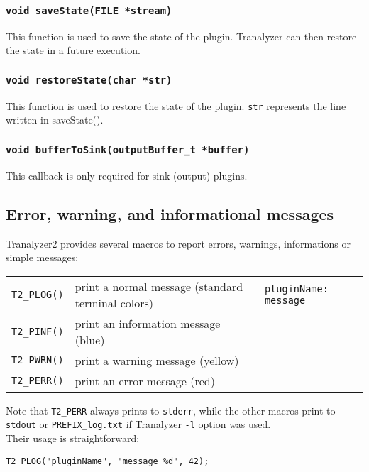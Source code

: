 \documentclass[documentation]{subfiles}
\begin{document}
\subsubsection{\tt void saveState(FILE *stream)}\label{t2cb-saveState}
This function is used to save the state of the plugin.
Tranalyzer can then restore the state in a future execution.

\subsubsection{\tt void restoreState(char *str)}\label{t2cb-restoreState}
This function is used to restore the state of the plugin.
{\tt str} represents the line written in {saveState()}.

\subsubsection{\tt void bufferToSink(outputBuffer\_t *buffer\label{t2cb-bufferToSink})}
This callback is only required for sink (output) plugins.

\subsection{Error, warning, and informational messages}
Tranalyzer2 provides several macros to report errors, warnings, informations or simple messages:
\begin{longtable}{lll}
    \toprule
    {\tt T2\_PLOG()} & print a normal message (standard terminal colors) & {\tt pluginName: message}\\
    {\tt T2\_PINF()} & print an information message (blue) & \color{blue}{\tt [INF] pluginName: message}\\
    {\tt T2\_PWRN()} & print a warning message (yellow) & \color[rgb]{1,.75,0}{\tt [WRN] pluginName: message}\\
    {\tt T2\_PERR()} & print an error message (red) & \color{red}{\tt [ERR] pluginName: message}\\
    \bottomrule
\end{longtable}
Note that {\tt T2\_PERR} always prints to {\tt stderr}, while the other macros print to {\tt stdout} or {\tt PREFIX\_log.txt} if Tranalyzer {\tt -l} option was used.\\

Their usage is straightforward:

\begin{center}
    {\tt T2\_PLOG("pluginName", "message \%d", 42);}
\end{center}
\end{document}
